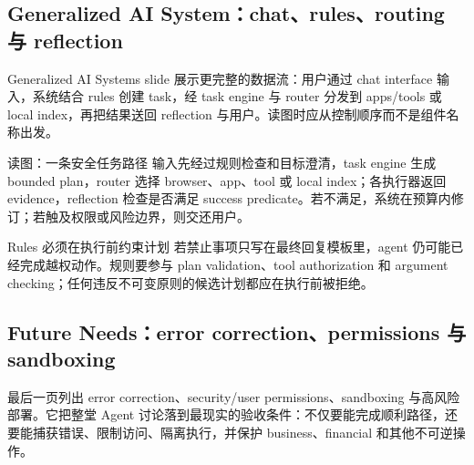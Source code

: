 
\subsection{Generalized AI System：chat、rules、routing 与 reflection}

Generalized AI Systems slide 展示更完整的数据流：用户通过 chat interface 输入，系统结合 rules 创建 task，经 task engine 与 router 分发到 apps/tools 或 local index，再把结果送回 reflection 与用户。读图时应从控制顺序而不是组件名称出发。


\begin{knowledgebox}{读图：一条安全任务路径}
输入先经过规则检查和目标澄清，task engine 生成 bounded plan，router 选择 browser、app、tool 或 local index；各执行器返回 evidence，reflection 检查是否满足 success predicate。若不满足，系统在预算内修订；若触及权限或风险边界，则交还用户。
\end{knowledgebox}

\begin{warningbox}{Rules 必须在执行前约束计划}
若禁止事项只写在最终回复模板里，agent 仍可能已经完成越权动作。规则要参与 plan validation、tool authorization 和 argument checking；任何违反不可变原则的候选计划都应在执行前被拒绝。
\end{warningbox}


\subsection{Future Needs：error correction、permissions 与 sandboxing}

最后一页列出 error correction、security/user permissions、sandboxing 与高风险部署。它把整堂 Agent 讨论落到最现实的验收条件：不仅要能完成顺利路径，还要能捕获错误、限制访问、隔离执行，并保护 business、financial 和其他不可逆操作。


